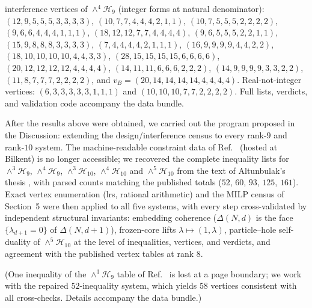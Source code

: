 \documentclass[11pt]{article}
\begin{document}
\begin{table}[t]
{interference vertices of $\wedge^4\mathcal{H}_9$ (integer forms at
natural denominator):
$(12{,}9{,}5{,}5{,}5{,}3{,}3{,}3{,}3)$,
$(10{,}7{,}7{,}4{,}4{,}4{,}2{,}1{,}1)$,
$(10{,}7{,}5{,}5{,}5{,}2{,}2{,}2{,}2)$,
$(9{,}6{,}6{,}4{,}4{,}4{,}1{,}1{,}1)$,
$(18{,}12{,}12{,}7{,}7{,}4{,}4{,}4{,}4)$,
$(9{,}6{,}5{,}5{,}5{,}2{,}2{,}1{,}1)$,
$(15{,}9{,}8{,}8{,}8{,}3{,}3{,}3{,}3)$,
$(7{,}4{,}4{,}4{,}4{,}2{,}1{,}1{,}1)$,
$(16{,}9{,}9{,}9{,}9{,}4{,}4{,}2{,}2)$,
$(18{,}10{,}10{,}10{,}10{,}4{,}4{,}3{,}3)$,
$(28{,}15{,}15{,}15{,}15{,}6{,}6{,}6{,}6)$,
$(20{,}12{,}12{,}12{,}12{,}4{,}4{,}4{,}4)$,
$(14{,}11{,}11{,}6{,}6{,}6{,}2{,}2{,}2)$,
$(14{,}9{,}9{,}9{,}9{,}3{,}3{,}2{,}2)$,
$(11{,}8{,}7{,}7{,}7{,}2{,}2{,}2{,}2)$,
and $v_B=(20{,}14{,}14{,}14{,}14{,}4{,}4{,}4{,}4)$.
Real-not-integer vertices: $(6{,}3{,}3{,}3{,}3{,}3{,}1{,}1{,}1)$ and
$(10{,}10{,}10{,}7{,}7{,}2{,}2{,}2{,}2)$. Full lists, verdicts, and
validation code accompany the data bundle.}
\label{tab:census}
\end{table}



After the results above were obtained, we carried out the program proposed in
the Discussion: extending the design/interference census to every rank-$9$ and
rank-$10$ system. The machine-readable constraint data of Ref.~\cite{AK2008}
(hosted at Bilkent) is no longer accessible; we recovered the complete
inequality lists for $\wedge^3\mathcal{H}_9$, $\wedge^4\mathcal{H}_9$,
$\wedge^3\mathcal{H}_{10}$, $\wedge^4\mathcal{H}_{10}$ and
$\wedge^5\mathcal{H}_{10}$ from the text of Altunbulak's thesis
\cite{AltunbulakThesis}, with parsed counts matching the published totals
($52$, $60$, $93$, $125$, $161$). Exact vertex enumeration (lrs, rational
arithmetic) and the MILP census of Section~5 were then applied to all five
systems, with every step cross-validated by independent structural
invariants: embedding coherence ($\Delta(N,d)$ is the face
$\{\lambda_{d+1}=0\}$ of $\Delta(N,d+1)$), frozen-core lifts
$\lambda \mapsto (1,\lambda)$, particle--hole self-duality of
$\wedge^5\mathcal{H}_{10}$ at the level of inequalities, vertices, and
verdicts, and agreement with the published vertex tables at rank $8$.

(One inequality of the $\wedge^3\mathcal{H}_9$ table of Ref.~\cite{AltunbulakThesis} is lost at a page boundary; we work with the repaired $52$-inequality system, which yields $58$ vertices consistent with all cross-checks. Details accompany the data bundle.)
\end{document}
